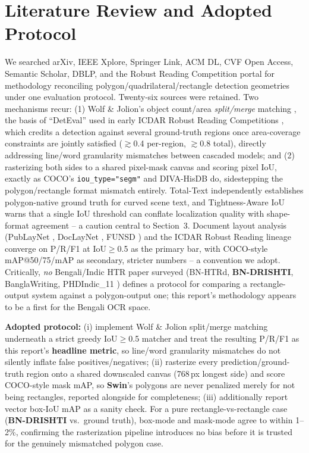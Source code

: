 \documentclass[10pt]{article}
\newcommand{\swin}{\textbf{Swin}}
\newcommand{\bnd}{\textbf{BN-DRISHTI}}
\begin{document}
\section{Literature Review and Adopted Protocol}

We searched arXiv, IEEE Xplore, Springer Link, ACM DL, CVF Open Access, Semantic
Scholar, DBLP, and the Robust Reading Competition portal for methodology reconciling
polygon/quadrilateral/rectangle detection geometries under one evaluation protocol.
Twenty-six sources were retained. Two mechanisms recur: (1) Wolf \& Jolion's
object count/area \emph{split/merge} matching \cite{wolf2006detEval}, the basis of
``DetEval'' used in early ICDAR Robust Reading Competitions
\cite{shahab2011icdar2011,karatzas2013icdar2013,karatzas2015icdar2015}, which credits
a detection against several ground-truth regions once area-coverage constraints are
jointly satisfied ($\gtrsim$0.4 per-region, $\gtrsim$0.8 total), directly addressing
line/word granularity mismatches between cascaded models; and (2) rasterizing both
sides to a shared pixel-mask canvas and scoring pixel IoU, exactly as COCO's
\texttt{iou\_type="segm"} \cite{lin2014coco} and DIVA-HisDB \cite{simistira2017divahisdb}
do, sidestepping the polygon/rectangle format mismatch entirely. Total-Text
\cite{chng2017totaltext,chng2020totaltext} independently establishes polygon-native
ground truth for curved scene text, and Tightness-Aware IoU \cite{liu2019tiou} warns
that a single IoU threshold can conflate localization quality with shape-format
agreement -- a caution central to Section~3. Document layout analysis (PubLayNet
\cite{zhong2019publaynet}, DocLayNet \cite{pfitzmann2022doclaynet}, FUNSD
\cite{jaume2019funsd}) and the ICDAR Robust Reading lineage converge on P/R/F1 at
IoU$\geq$0.5 as the primary bar, with COCO-style mAP@50/75/mAP as secondary, stricter
numbers -- a convention we adopt. Critically, \emph{no} Bengali/Indic HTR paper
surveyed (BN-HTRd, \bnd{}, BanglaWriting, PHDIndic\_11 \cite{obaidullah2018phdindic11})
defines a protocol for comparing a rectangle-output system against a polygon-output
one; this report's methodology appears to be a first for the Bengali OCR space.

\textbf{Adopted protocol:} (i) implement Wolf \& Jolion split/merge matching
\cite{wolf2006detEval} underneath a strict greedy IoU$\geq$0.5 matcher and treat the
resulting P/R/F1 as this report's \textbf{headline metric}, so line/word granularity
mismatches do not silently inflate false positives/negatives; (ii) rasterize every
prediction/ground-truth region onto a shared downscaled canvas (768\,px longest side)
and score COCO-style mask mAP, so \swin's polygons are never penalized merely for not
being rectangles, reported alongside for completeness; (iii) additionally report
vector box-IoU mAP as a sanity check. For a pure rectangle-vs-rectangle case (\bnd{}
vs.\ ground truth), box-mode and mask-mode agree to within 1--2\%, confirming the
rasterization pipeline introduces no bias before it is trusted for the genuinely
mismatched polygon case.
\end{document}
